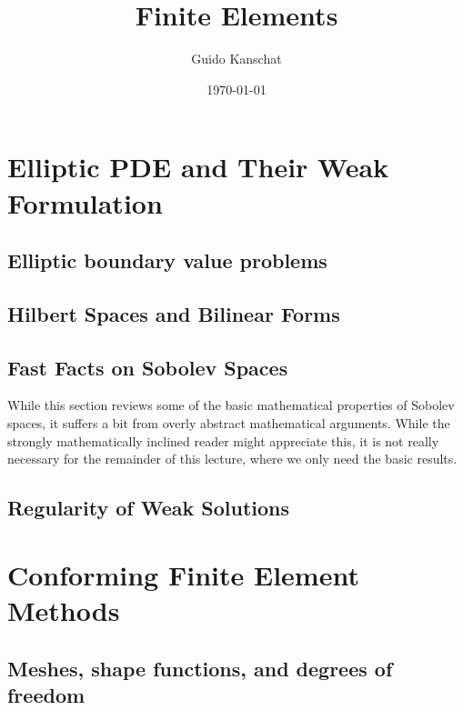 \usepackage[notref,notcite]{showkeys}
\usepackage{tikz}
\usetikzlibrary{svg.path}


\def\constref#1{C_{\text{\ref{#1}}}}
\title{Finite Elements}
\author{Guido Kanschat}
\date{\today}


\maketitle
\tableofcontents
\chapter{Elliptic PDE and Their Weak Formulation}
\section{Elliptic boundary value problems}


\section{Hilbert Spaces and Bilinear Forms}


\section{Fast Facts on Sobolev Spaces}

\begin{intro}
  While this section reviews some of the basic mathematical properties
  of Sobolev spaces, it suffers a bit from overly abstract
  mathematical arguments. While the strongly mathematically inclined
  reader might appreciate this, it is not really necessary for the
  remainder of this lecture, where we only need the basic results.
\end{intro}


\section{Regularity of Weak Solutions}


\chapter{Conforming Finite Element Methods}
\section{Meshes, shape functions, and degrees of freedom}

